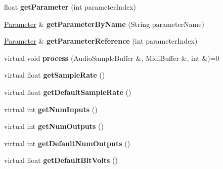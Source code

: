 \begin{DoxyCompactItemize}
\item 
\hypertarget{classGenericProcessor_ae857c2fdef2d84ad20957a992889cdd7}{float {\bfseries get\-Parameter} (int parameter\-Index)}\label{classGenericProcessor_ae857c2fdef2d84ad20957a992889cdd7}

\item 
\hypertarget{classGenericProcessor_a7b3c8dcb0ba4bf1f71a65da4ad47f063}{\hyperlink{classParameter}{Parameter} \& {\bfseries get\-Parameter\-By\-Name} (String parameter\-Name)}\label{classGenericProcessor_a7b3c8dcb0ba4bf1f71a65da4ad47f063}

\item 
\hypertarget{classGenericProcessor_a1d58b5412eb6d031ad77ebf90cf7eeac}{\hyperlink{classParameter}{Parameter} \& {\bfseries get\-Parameter\-Reference} (int parameter\-Index)}\label{classGenericProcessor_a1d58b5412eb6d031ad77ebf90cf7eeac}

\item 
\hypertarget{classGenericProcessor_ac8746345d01c5de419d944ef20bc98e5}{virtual void {\bfseries process} (Audio\-Sample\-Buffer \&, Midi\-Buffer \&, int \&)=0}\label{classGenericProcessor_ac8746345d01c5de419d944ef20bc98e5}

\item 
\hypertarget{classGenericProcessor_a31f587ffcaddf91918013605d58651fe}{virtual float {\bfseries get\-Sample\-Rate} ()}\label{classGenericProcessor_a31f587ffcaddf91918013605d58651fe}

\item 
\hypertarget{classGenericProcessor_ad82b2eb662c16c4509ecd84d33e01eba}{virtual float {\bfseries get\-Default\-Sample\-Rate} ()}\label{classGenericProcessor_ad82b2eb662c16c4509ecd84d33e01eba}

\item 
\hypertarget{classGenericProcessor_aee3dea28d03bb09bdb4799343aaa2388}{virtual int {\bfseries get\-Num\-Inputs} ()}\label{classGenericProcessor_aee3dea28d03bb09bdb4799343aaa2388}

\item 
\hypertarget{classGenericProcessor_a25f5d4ef799bdb5029ea96eedf462bf3}{virtual int {\bfseries get\-Num\-Outputs} ()}\label{classGenericProcessor_a25f5d4ef799bdb5029ea96eedf462bf3}

\item 
\hypertarget{classGenericProcessor_aef569283cc91483814b210922cf96d26}{virtual int {\bfseries get\-Default\-Num\-Outputs} ()}\label{classGenericProcessor_aef569283cc91483814b210922cf96d26}

\item 
\hypertarget{classGenericProcessor_ac72dab4ba6fd23478986c4927d30ae46}{virtual float {\bfseries get\-Default\-Bit\-Volts} ()}\label{classGenericProcessor_ac72dab4ba6fd23478986c4927d30ae46}


\end{DoxyCompactItemize}

